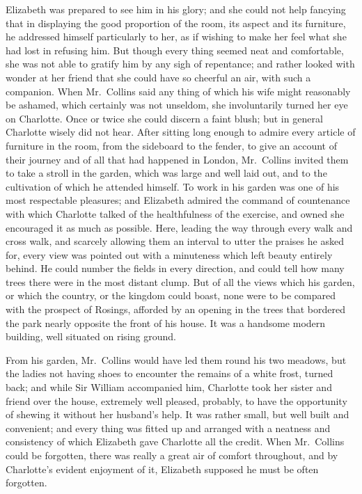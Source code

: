 Elizabeth was prepared to see him in his glory; and
she could not help fancying that in displaying the good
proportion of the room, its aspect and its furniture, he
addressed himself particularly to her, as if wishing to
make her feel what she had lost in refusing him. But
though every thing seemed neat and comfortable, she
was not able to gratify him by any sigh of repentance;
and rather looked with wonder at her friend that she
could have so cheerful an air, with such a companion.
When Mr.\ Collins said any thing of which his wife might
reasonably be ashamed, which certainly was not unseldom,
she involuntarily turned her eye on Charlotte. Once or
twice she could discern a faint blush; but in general
Charlotte wisely did not hear. After sitting long enough
to admire every article of furniture in the room, from the
sideboard to the fender, to give an account of their journey
and of all that had happened in London, Mr.\ Collins
invited them to take a stroll in the garden, which was large
and well laid out, and to the cultivation of which he
attended himself. To work in his garden was one of his
most respectable pleasures; and Elizabeth admired the
command of countenance with which Charlotte talked of
the healthfulness of the exercise, and owned she encouraged
it as much as possible. Here, leading the way through
every walk and cross walk, and scarcely allowing them an
interval to utter the praises he asked for, every view was
pointed out with a minuteness which left beauty entirely
behind. He could number the fields in every direction,
and could tell how many trees there were in the most
distant clump. But of all the views which his garden,
or which the country, or the kingdom could boast, none
were to be compared with the prospect of Rosings, afforded
by an opening in the trees that bordered the park nearly
opposite the front of his house. It was a handsome
modern building, well situated on rising ground.

From his garden, Mr.\ Collins would have led them round
his two meadows, but the ladies not having shoes to
encounter the remains of a white frost, turned back; and
while Sir William accompanied him, Charlotte took her
sister and friend over the house, extremely well pleased,
probably, to have the opportunity of shewing it without
her husband’s help. It was rather small, but well built
and convenient; and every thing was fitted up and
arranged with a neatness and consistency of which Elizabeth
gave Charlotte all the credit. When Mr.\ Collins
could be forgotten, there was really a great air of comfort
throughout, and by Charlotte’s evident enjoyment of it,
Elizabeth supposed he must be often forgotten.


